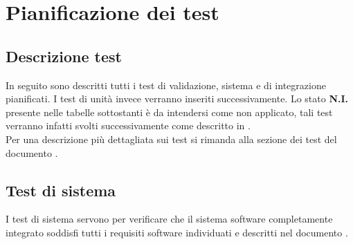 %



\section{Pianificazione dei test}
	\subsection{Descrizione test}
		In seguito sono descritti tutti i test di validazione, sistema e di integrazione pianificati. I test di unità invece verranno inseriti successivamente.
Lo stato \textbf{N.I.} presente nelle tabelle sottostanti è da intendersi come non applicato, tali test verranno infatti svolti successivamente come descritto in \docNameVersionPdP.\\
Per una descrizione più dettagliata sui test si rimanda alla sezione dei test del documento \docNameVersionNdP.

	\subsection{Test di sistema}
		I test di sistema servono per verificare che il sistema software completamente integrato soddisfi tutti i requisiti software individuati e descritti nel documento \docNameVersionAdR.
